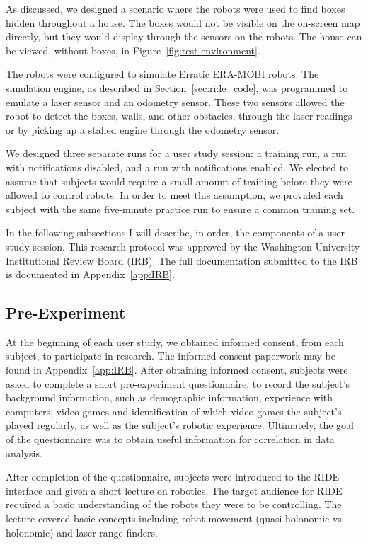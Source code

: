 As discussed, we designed a scenario where the robots were used to find boxes hidden throughout a house. The boxes would not be visible on the on-screen map directly, but they would display through the sensors on the robots. The house can be viewed, without boxes, in Figure~\ref{fig:test-environment}. 

The robots were configured to simulate Erratic ERA-MOBI robots. The simulation engine, as described in Section~\ref{sec:ride_code}, was programmed to emulate a laser sensor and an odometry sensor. These two sensors allowed the robot to detect the boxes, walls, and other obstacles, through the laser readings or by picking up a stalled engine through the odometry sensor.

We designed three separate runs for a user study session: a training run, a run with notifications disabled, and a run with notifications enabled. We elected to assume that subjects would require a small amount of training before they were allowed to control robots. In order to meet this assumption, we provided each subject with the same five-minute practice run to ensure a common training set.

In the following subsections I will describe, in order, the components of a user study session. This research protocol was approved by the Washington University Institutional Review Board (IRB). The full documentation submitted to the IRB is documented in Appendix~\ref{app:IRB}.

\subsection{Pre-Experiment} %
\label{sub:pre_experiment}

At the beginning of each user study, we obtained informed consent, from each subject, to participate in research. The informed consent paperwork may be found in Appendix~\ref{app:IRB}. After obtaining informed consent, subjects were asked to complete a short pre-experiment questionnaire, to record the subject’s background information, such as demographic information, experience with computers, video games and identification of which video games the subject’s played regularly, as well as the subject’s robotic experience. Ultimately, the goal of the questionnaire was to obtain useful information for correlation in data analysis. 

After completion of the questionnaire, subjects were introduced to the RIDE interface and given a short lecture on robotics. The target audience for RIDE required a basic understanding of the robots they were to be controlling. The lecture covered basic concepts including robot movement (quasi-holonomic vs. holonomic) and laser range finders.

